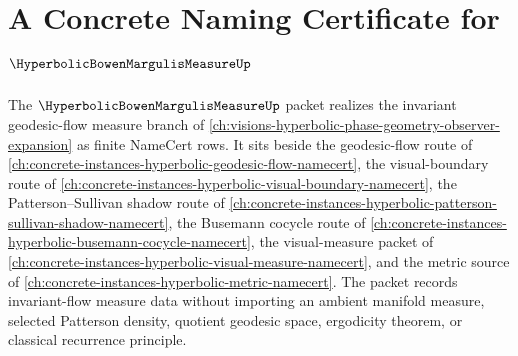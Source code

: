 \chapter{A Concrete Naming Certificate for $\HyperbolicBowenMargulisMeasureUp$}
\label{ch:concrete-instances-hyperbolic-bowen-margulis-measure-namecert}

The $\HyperbolicBowenMargulisMeasureUp$ packet realizes the invariant geodesic-flow measure branch of \autoref{ch:visions-hyperbolic-phase-geometry-observer-expansion} as finite NameCert rows. It sits beside the geodesic-flow route of \autoref{ch:concrete-instances-hyperbolic-geodesic-flow-namecert}, the visual-boundary route of \autoref{ch:concrete-instances-hyperbolic-visual-boundary-namecert}, the Patterson--Sullivan shadow route of \autoref{ch:concrete-instances-hyperbolic-patterson-sullivan-shadow-namecert}, the Busemann cocycle route of \autoref{ch:concrete-instances-hyperbolic-busemann-cocycle-namecert}, the visual-measure packet of \autoref{ch:concrete-instances-hyperbolic-visual-measure-namecert}, and the metric source of \autoref{ch:concrete-instances-hyperbolic-metric-namecert}. The packet records invariant-flow measure data without importing an ambient manifold measure, selected Patterson density, quotient geodesic space, ergodicity theorem, or classical recurrence principle.

